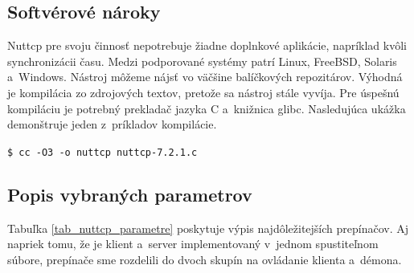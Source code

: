         \subsection{Softvérové nároky} \label{nuttcp_sw}
        Nuttcp pre svoju činnosť nepotrebuje žiadne doplnkové aplikácie,
        napríklad kvôli synchronizácii času. Medzi podporované systémy 
        patrí Linux, FreeBSD, Solaris a~Windows. Nástroj môžeme nájsť vo
        väčšine balíčkových repozitárov. Výhodná je kompilácia zo zdrojových
        textov, pretože sa nástroj stále vyvíja. Pre úspešnú kompiláciu je 
        potrebný prekladač jazyka C a~knižnica glibc.
        Nasledujúca ukážka demonštruje jeden z~príkladov kompilácie.

        \begin{flushleft}
            \texttt{\$ cc -O3 -o nuttcp  nuttcp-7.2.1.c} \\
        \end{flushleft}

        \subsection{Popis vybraných parametrov} \label{nuttcp_param}
        Tabuľka \ref{tab_nuttcp_parametre} poskytuje výpis najdôležitejších
        prepínačov. Aj napriek tomu, že je klient a~server implementovaný
        v~jednom spustiteľnom súbore, prepínače sme rozdelili do dvoch skupín
        na ovládanie klienta a~démona.

